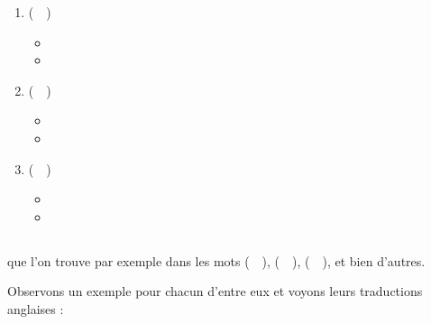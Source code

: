 \begin{enumerate}
\item {} (~~)
  \begin{itemize}
  \item {}
    \item {}
    \end{itemize}
    
\item {} (~~)
  \begin{itemize}
  \item {}
  \item {}
  \end{itemize}

\item {} (~~)
  \begin{itemize}
  \item {}
  \item {}
  \end{itemize}
   
\end{enumerate}         
        
\subsection{}\label{subsec:yfr}

 que l'on trouve par exemple dans les mots
 (~~),  (~~),  (~~), et bien d'autres.

Observons un exemple pour chacun d'entre eux et voyons leurs
traductions anglaises :\par

